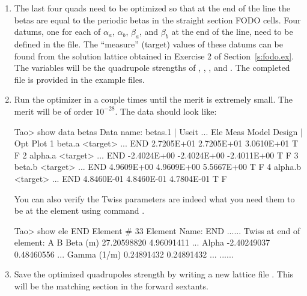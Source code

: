 \documentclass{hitec}     %
\begin{document}
{\begin{enumerate}[leftmargin=*]
\begin{code}
use, ARC_TO_SSF
\end{code}
The completed initial lattice file containing these changes is provided in the example files, named . 
%
\item
The last four quads need to be optimized so that at the end of the  line the betas are equal to the periodic betas in the straight section FODO cells. 
Four datums, one for each of $\alpha_a$, $\alpha_b$, $\beta_a$, and $\beta_b$ at the end of the line, 
need to be defined in the  file.  
The ``measure'' (target) values of these datums can be found from the solution lattice  obtained in Exercise 2 of Section~\ref{s:fodo.ex}. The variables will be the quadrupole strengths of , , , and . The completed  file is provided in the example files.
%
\item
Run the optimizer in \tao a couple times until the merit is extremely small. The merit will be of order $10^{-28}$. The data should look like:
\begin{code}
Tao> show data betas
Data name: betas.1
                                                                    |  Useit
                    ... Ele          Meas        Model       Design | Opt Plot
1  beta.a <target>  ... END   2.7205E+01   2.7205E+01   3.0610E+01     T    F
2  alpha.a <target> ... END  -2.4024E+00  -2.4024E+00  -2.4011E+00     T    F
3  beta.b <target>  ... END   4.9609E+00   4.9609E+00   5.5667E+00     T    F
4  alpha.b <target> ... END   4.8460E-01   4.8460E-01   4.7804E-01     T    F

\end{code}

You can also verify the Twiss parameters are indeed what you need them to be at the  element using command .
\begin{code}
Tao> show ele END
Element # 33
Element Name: END
......
Twiss at end of element:
                          A              B  
  Beta (m)        27.20598820     4.96091411  ...
  Alpha           -2.40249037     0.48460556  ...
  Gamma (1/m)      0.24891432     0.24891432  ...
......
\end{code}
%
\item
Save the optimized quadrupoles strength by writing a new lattice file . This will be the matching section in the forward sextants.
\end{enumerate}

}
\end{document}
